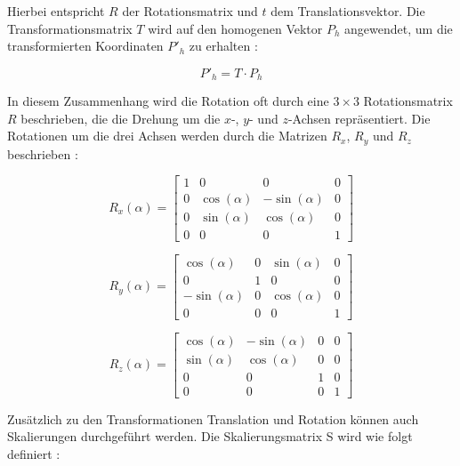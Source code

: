 Hierbei entspricht \( R \) der Rotationsmatrix und \( t \) dem Translationsvektor. Die Transformationsmatrix \( T \) wird auf den homogenen Vektor \(P_h\) angewendet, um die transformierten Koordinaten \(P'_h\) zu erhalten \cite{doerner2022virtual, gao2021vSLAM, freescale2010math3d}:

\begin{equation} 
    P'_h = T \cdot P_h \label{eq:transformationsmatrix}
\end{equation}

In diesem Zusammenhang wird die Rotation oft durch eine \(3\times3\) Rotationsmatrix \( R \) beschrieben, die die Drehung um die \(x\)-, \(y\)- und \(z\)-Achsen repräsentiert. Die Rotationen um die drei Achsen werden durch die Matrizen \(R_x\), \(R_y\) und \(R_z\) beschrieben \cite{doerner2022virtual, gao2021vSLAM, freescale2010math3d}:


\begin{equation}
    R_x(\alpha) =
    \begin{bmatrix}
        1 & 0 & 0 & 0 \\
        0 & \cos(\alpha) & -\sin(\alpha) & 0 \\
        0 & \sin(\alpha) & \cos(\alpha) & 0 \\
        0 & 0 & 0 & 1
    \end{bmatrix}
\end{equation}

\begin{equation}
    R_y(\alpha) =
    \begin{bmatrix}
        \cos(\alpha) & 0 & \sin(\alpha) & 0 \\
        0 & 1 & 0 & 0 \\
        -\sin(\alpha) & 0 & \cos(\alpha) & 0 \\
        0 & 0 & 0 & 1
    \end{bmatrix}
\end{equation}

\begin{equation}
    R_z(\alpha) =
    \begin{bmatrix}
        \cos(\alpha) & -\sin(\alpha) & 0 & 0 \\
        \sin(\alpha) & \cos(\alpha) & 0 & 0 \\
        0 & 0 & 1 & 0 \\
        0 & 0 & 0 & 1
    \end{bmatrix}
\end{equation}

Zusätzlich zu den Transformationen Translation und Rotation können auch Skalierungen durchgeführt werden. Die Skalierungsmatrix S wird wie folgt definiert \cite{doerner2022virtual, gao2021vSLAM, freescale2010math3d}:


